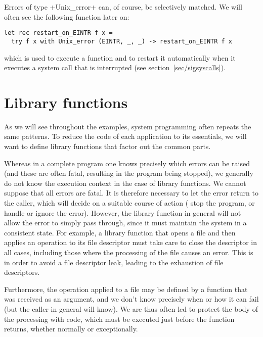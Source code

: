 Errors of type \ml+Unix_error+  can, of course, be
selectively matched. We will often see the following
function later on:
%
\begin{lstlisting}
let rec restart_on_EINTR f x = 
  try f x with Unix_error (EINTR, _, _) -> restart_on_EINTR f x 
\end{lstlisting}
%
which is used to execute a function and to restart it automatically
when it executes a system call that is interrupted (see section~\ref{sec/sigsyscalls}).

\section{Library functions}

As we will see throughout the examples, system programming often
repeats the same patterns. To reduce the code of each application to
its essentials, we will want to define library functions that
factor out the common parts.

Whereas in a complete program one knows precisely which errors can be
raised (and these are often fatal, resulting in the program being stopped),
we generally do not know the execution context in the case of library functions. We
cannot suppose that all errors are fatal. It is therefore necessary to
let the error return to the caller, which will decide on a suitable
course of action (\eg{} stop the program, or handle or ignore the error). However,
the library function in general will not allow the error to simply pass
through, since it must maintain the system in a consistent state. For
example, a library function that opens a file and then applies an
operation to its file descriptor must take care to close the
descriptor in all cases, including those where the processing of the
file causes an error. This is in order to avoid a file descriptor
leak, leading to the exhaustion of file descriptors.

Furthermore, the operation applied to a file may be defined by a
function that was received as an argument, and we don't know precisely
when or how it can fail (but the caller in general will know). We are
thus often led to protect the body of the processing with
 code, which must be executed just before the
function returns, whether normally or exceptionally.

